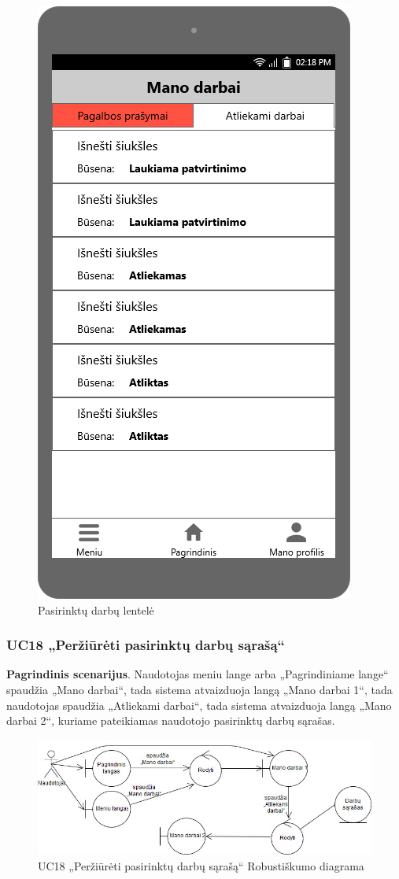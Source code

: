 \documentclass{VUMIFPSbakalaurinis}
\begin{document}
\begin{figure}[H]
	\centering
	\includegraphics[scale=0.4]{img/ScreenShots/06-Mano-darbai2}
	\caption{Pasirinktų darbų lentelė}
	\label{img:selected jobs table}
\end{figure}
\subsubsection{UC18 „Peržiūrėti pasirinktų darbų sąrašą“}
\textbf{Pagrindinis scenarijus}. Naudotojas meniu lange arba „Pagrindiniame lange“ spaudžia „Mano darbai“, tada sistema atvaizduoja langą „Mano darbai 1“, tada naudotojas spaudžia „Atliekami darbai“, tada sistema atvaizduoja langą „Mano darbai 2“, kuriame pateikiamas naudotojo pasirinktų darbų sąrašas.

\begin{figure}[H]
	\centering
	\includegraphics[scale=0.6]{img/Robustness/UC18}
	\caption{UC18 „Peržiūrėti pasirinktų darbų sąrašą“ Robustiškumo diagrama}
	\label{img:uc18rob}
\end{figure}
\end{document}
